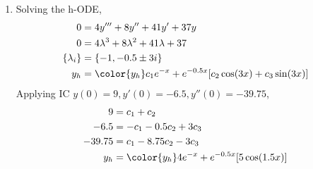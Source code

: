 \begin{enumerate}
    \item Solving the h-ODE,
          \begin{align}
              0               & = 4y''' + 8y'' + 41y' + 37y                    \\
              0               & = 4\lambda^{3} + 8\lambda^{2} + 41\lambda + 37 \\
              \{\lambda_{i}\} & = \{-1, -0.5 \pm 3i\}                          \\
              y_{h}           & = \color{y_h} c_{1}e^{-x}
              + e^{-0.5x}[c_{2}\cos(3x) + c_{3}\sin(3x)]
          \end{align}
          Applying IC $ y(0) = 9, y'(0) = -6.5, y''(0) = -39.75 $,
          \begin{align}
              9      & = c_{1} + c_{2}                                 \\
              -6.5   & = -c_{1} - 0.5c_{2} + 3c_{3}                    \\
              -39.75 & = c_{1} - 8.75c_{2} - 3c_{3}                    \\
              y_{h}  & = \color{y_h} 4e^{-x} + e^{-0.5x} [5\cos(1.5x)]
          \end{align}
          \begin{figure}[H]
              \centering
          \end{figure}


\end{enumerate}
